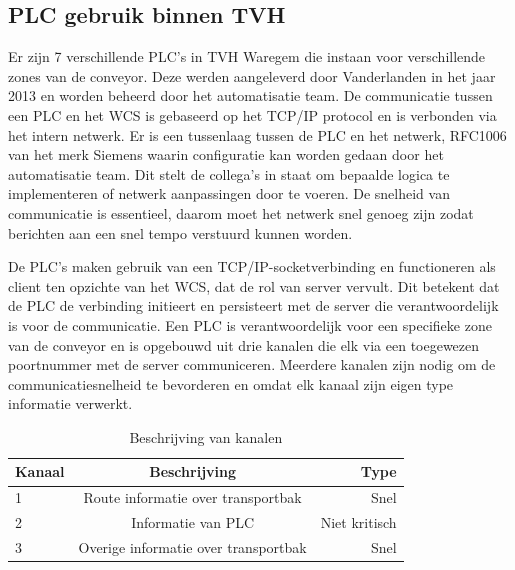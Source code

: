 \subsection{PLC gebruik binnen TVH}
Er zijn 7 verschillende PLC's in TVH Waregem die instaan voor verschillende zones van de conveyor.
Deze werden aangeleverd door Vanderlanden in het jaar 2013 en worden beheerd door het automatisatie team.
De communicatie tussen een PLC en het WCS is gebaseerd op het TCP/IP protocol en is verbonden via het intern netwerk.
Er is een tussenlaag tussen de PLC en het netwerk, RFC1006 van het merk Siemens waarin configuratie kan worden gedaan door het automatisatie team.
Dit stelt de collega's in staat om bepaalde logica te implementeren of netwerk aanpassingen door te voeren.
De snelheid van communicatie is essentieel, daarom moet het netwerk snel genoeg zijn zodat berichten aan een snel tempo verstuurd kunnen worden.

De PLC's maken gebruik van een TCP/IP-socketverbinding en functioneren als client ten opzichte van het WCS, dat de rol van server vervult. 
Dit betekent dat de PLC de verbinding initieert en persisteert met de server die verantwoordelijk is voor de communicatie.
Een PLC is verantwoordelijk voor een specifieke zone van de conveyor en is opgebouwd uit drie kanalen die elk via een toegewezen poortnummer met de server communiceren. 
Meerdere kanalen zijn nodig om de communicatiesnelheid te bevorderen en omdat elk kanaal zijn eigen type informatie verwerkt.

\begin{table}[!h]
  \centering
  \begin{tabular}{lcr}
    \toprule
    \textbf{Kanaal} & \textbf{Beschrijving} & \textbf{Type}                        \\
    \midrule
    1                & Route informatie over transportbak          & Snel           \\
    2                & Informatie van PLC                          & Niet kritisch  \\
    3                & Overige informatie over transportbak        & Snel           \\
    \bottomrule
  \end{tabular}
  \caption[Channel assignment]{\label{tab:channel-assignment}Beschrijving van kanalen}
\end{table}

